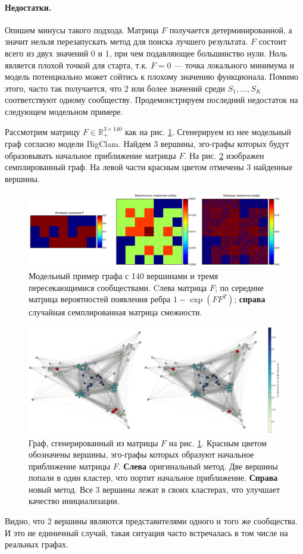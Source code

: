 \documentclass{ITaSconf}
\def\RR{\mathbb{R}}
\begin{document}
\paragraph{Недостатки.}
Опишем минусы такого подхода. 
Матрица $F$ получается детерминированной, а значит нельзя перезапускать метод для поиска лучшего результата.
$F$ состоит всего из двух значений 0 и 1, при чем подавляющее большинство нули. 
Ноль является плохой точкой для старта, т.к. $F=0$ --- точка локального минимума и модель потенциально может сойтись к плохому значению функционала.
Помимо этого, часто так получается, что 2 или более значений среди $S_1, \dots, S_K$ соответствуют одному сообществу. 
Продемонстрируем последний недостаток на следующем модельном примере.

Рассмотрим матрицу $F\in \RR_{+}^{3\times 140}$ как на рис. \ref{fig:model_ex}. 
Сгенерируем из нее модельный граф согласно модели BigClam. 
Найдем 3 вершины, эго-графы которых будут образовывать начальное приближение матрицы $F$. 
На рис. \ref{fig:model_ex_graph} изображен семплированный граф. 
На левой части красным цветом отмечены 3 найденные вершины.
\begin{figure}[!ht]
	\centering
	\includegraphics[width=\linewidth]{imgs/model_example.png}
	\caption{Модельный пример графа с 140 вершинами и тремя пересекающимися сообществами. Cлева матрица $F$; по середине матрица вероятностей появления ребра $1-\exp(FF^T)$; \textbf{справа} случайная семплированная матрица смежности.}
	\label{fig:model_ex}
\end{figure}
\begin{figure}[!ht]
	\centering
	\includegraphics[width=\linewidth]{imgs/model_example_graph_good_init_pres.png}
	\caption{Граф, сгенерированный из матрицы $F$ на рис. \ref{fig:model_ex}. Красным цветом обозначены вершины, эго-графы которых образуют начальное приближение матрицы $F$. \textbf{Слева} оригинальный метод. Две вершины попали в один кластер, что портит начальное приближение. \textbf{Справа} новый метод. Все 3 вершины лежат в своих кластерах, что улучшает качество инициализации.}
	\label{fig:model_ex_graph}
\end{figure}
Видно, что 2 вершины являются представителями одного и того же сообщества. 
И это не единичный случай, такая ситуация часто встречалась в том числе на реальных графах. 
\end{document}
